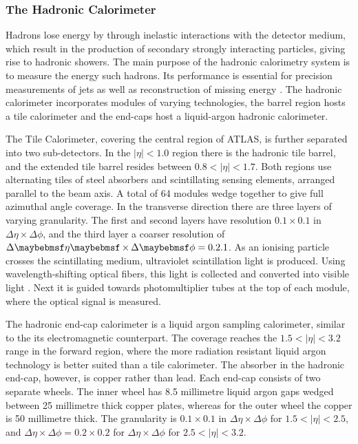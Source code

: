\subsubsection{The Hadronic Calorimeter}
Hadrons lose energy by through inelastic interactions with the detector medium, which result in the production of secondary strongly interacting particles, giving rise to hadronic showers. The main purpose of the hadronic calorimetry system is to measure the energy such hadrons. Its performance is essential for precision measurements of jets as well as reconstruction of missing energy \cite{Aaboud:2018scw}. The hadronic calorimeter incorporates modules of varying technologies, the barrel region hosts a tile calorimeter and the end-caps host a liquid-argon hadronic calorimeter. 

The Tile Calorimeter, covering the central region of ATLAS, is further separated into two sub-detectors. In the $|\eta| < 1.0$ region there is the hadronic tile barrel, and the extended tile barrel resides between $0.8 < |\eta| < 1.7$. Both regions use alternating tiles of steel absorbers and scintillating sensing elements, arranged parallel to the beam axis. A total of 64 modules wedge together to give full azimuthal angle coverage. In the transverse direction there are three layers of varying granularity. The first and second layers have resolution $0.1 \times 0.1$ in $\Delta\eta\times\Delta\phi$, and the third layer a coarser resolution of $\Delta\eta\times\Delta\phi = 0.2 \time 0.1$. As an ionising particle crosses the scintillating medium, ultraviolet scintillation light is produced. Using wavelength-shifting optical fibers, this light is collected and converted into visible light . Next it is guided towards photomultiplier tubes at the top of each module, where the optical signal is measured.

The hadronic end-cap calorimeter is a liquid argon sampling calorimeter, similar to the its electromagnetic counterpart. The coverage reaches the $1.5 < |\eta| < 3.2$ range in the forward region, where the more radiation resistant liquid argon technology is better suited than a tile calorimeter. The absorber in the hadronic end-cap, however, is copper rather than lead. Each end-cap consists of two separate wheels. The inner wheel has 8.5 millimetre liquid argon gaps wedged between 25 millimetre thick copper plates, whereas for the outer wheel the copper is 50 millimetre thick. The granularity is $0.1 \times 0.1$ in $\Delta\eta\times\Delta\phi$ for $1.5 < |\eta| < 2.5$, and $\Delta\eta\times\Delta\phi = 0.2 \times 0.2$ for $\Delta\eta\times\Delta\phi$ for $2.5 < |\eta| < 3.2$.


